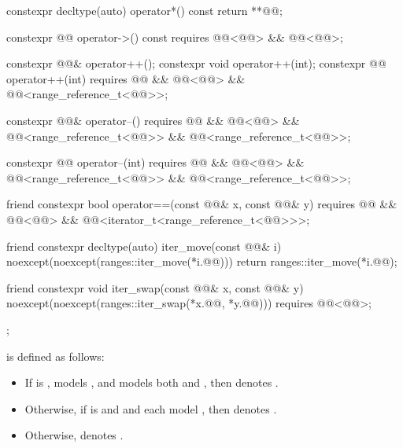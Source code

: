 \begin{codeblock}
{{    constexpr decltype(auto) operator*() const { return **@@; }

    constexpr @@ operator->() const
      requires @@<@@> && @@<@@>;

    constexpr @@& operator++();
    constexpr void operator++(int);
    constexpr @@ operator++(int)
      requires @@ && @@<@@> &&
               @@<range_reference_t<@@>>;

    constexpr @@& operator--()
      requires @@ && @@<@@> &&
               @@<range_reference_t<@@>> &&
               @@<range_reference_t<@@>>;

    constexpr @@ operator--(int)
      requires @@ && @@<@@> &&
               @@<range_reference_t<@@>> &&
               @@<range_reference_t<@@>>;

    friend constexpr bool operator==(const @@& x, const @@& y)
      requires @@ && @@<@@> &&
               @@<iterator_t<range_reference_t<@@>>>;

    friend constexpr decltype(auto) iter_move(const @@& i)
    noexcept(noexcept(ranges::iter_move(*i.@@))) {
      return ranges::iter_move(*i.@@);
    }

    friend constexpr void iter_swap(const @@& x, const @@& y)
      noexcept(noexcept(ranges::iter_swap(*x.@@, *y.@@)))
      requires @@<@@>;
  };
}
\end{codeblock}

\pnum
{} is defined as follows:
\begin{itemize}
\item If  is ,
   models , and
   models
  both  and ,
  then  denotes .
\item Otherwise, if  is  and
   and 
  each model , then  denotes
  .
\item Otherwise,  denotes .
\end{itemize}

